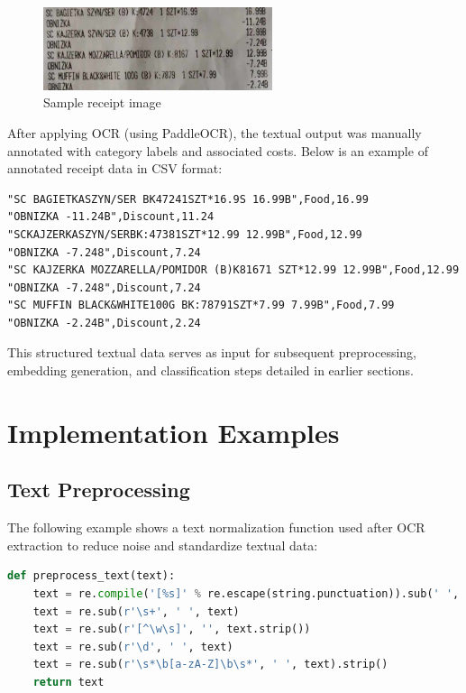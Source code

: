 \documentclass{SGGW-thesis-EN}
\begin{document}
\begin{figure}[h!]
    \centering
    \includegraphics[width=0.6\textwidth]{images/sample_receipt.jpg}
    \caption{Sample receipt image}
    \label{fig:sample_receipt}
\end{figure}

After applying OCR (using PaddleOCR), the textual output was manually annotated with category labels and associated costs.  
Below is an example of annotated receipt data in CSV format:

\begin{verbatim}
"SC BAGIETKASZYN/SER BK47241SZT*16.9S 16.99B",Food,16.99
"OBNIZKA -11.24B",Discount,11.24
"SCKAJZERKASZYN/SERBK:47381SZT*12.99 12.99B",Food,12.99
"OBNIZKA -7.248",Discount,7.24
"SC KAJZERKA MOZZARELLA/POMIDOR (B)K81671 SZT*12.99 12.99B",Food,12.99
"OBNIZKA -7.248",Discount,7.24
"SC MUFFIN BLACK&WHITE100G BK:78791SZT*7.99 7.99B",Food,7.99
"OBNIZKA -2.24B",Discount,2.24
\end{verbatim}

This structured textual data serves as input for subsequent preprocessing, embedding generation, and classification steps detailed in earlier sections.


\section{Implementation Examples}

\subsection{Text Preprocessing}

The following example shows a text normalization function used after OCR extraction to reduce noise and standardize textual data:

\begin{lstlisting}[language=Python, caption={Post-OCR text preprocessing}, label={lst:preprocessing}]
def preprocess_text(text):
    text = re.compile('[%s]' % re.escape(string.punctuation)).sub(' ', text)
    text = re.sub(r'\s+', ' ', text)
    text = re.sub(r'[^\w\s]', '', text.strip())
    text = re.sub(r'\d', ' ', text)
    text = re.sub(r'\s*\b[a-zA-Z]\b\s*', ' ', text).strip()
    return text
\end{lstlisting}
\label{code:preprocessing_example}
\end{document}

